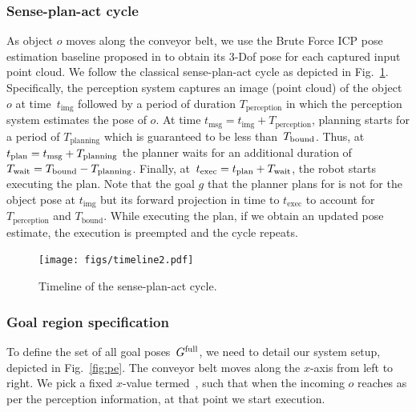 \documentclass[a4paper]{report}
\begin{document}
\subsubsection{Sense-plan-act cycle}
As object $o$ moves along the conveyor belt, we use the Brute Force ICP pose estimation baseline proposed in \cite{narayanan2016perch} to obtain its 3-Dof pose for each captured input point cloud.
We follow the classical sense-plan-act cycle as depicted in Fig.~\ref{fig:tl}.
Specifically, 
the perception system captures an image (point cloud) of the object~$o$ at time~$t_{\textrm{img}}$
followed by a period of duration $T_{\textrm{perception}}$ in which the perception system estimates the pose of $o$.
At time $t_{\textrm{msg}} = t_{\textrm{img}} + T_{\textrm{perception}}$, planning starts for a period of $T_{\textrm{planning}}$ which is guaranteed to be less than~$T_{\textrm{bound}}$.
Thus, at $t_{\textrm{plan}} = t_{\textrm{msg}} + T_{\rm planning}$ the planner waits for an additional duration of $T_{\rm wait} = T_{\textrm{bound}} - T_{\rm planning}$.
Finally, at~$t_{\textrm{exec}} = t_{\textrm{plan}} + T_{\rm wait}$, the robot starts executing the plan. Note that the goal $g$ that the planner plans for is not for the object pose at $t_{\textrm{img}}$ but its forward projection in time to $t_{\textrm{exec}}$ to account for $T_{\textrm{perception}}$ and $T_{\textrm{bound}}$.
While executing the plan, if we obtain an updated pose estimate, the execution is preempted and the cycle repeats.

\begin{figure}[t]
    \centering
    \texttt{[image: figs/timeline2.pdf]}
    \caption{\CaptionTextSize Timeline of the sense-plan-act cycle.}
    \label{fig:tl}
\end{figure}

\subsubsection{Goal region specification}
\label{sec:goal_region}
To define the set of all goal poses~$G^{\textrm{full}}$, we need to detail our system setup, depicted in Fig.~\ref{fig:pe}.
The conveyor belt moves along the $x$-axis from left to right.
We pick a fixed $x$-value termed~\Xexec, such that when the incoming $o$ reaches \Xexec as per the perception information, at that point we start execution.
\end{document}

